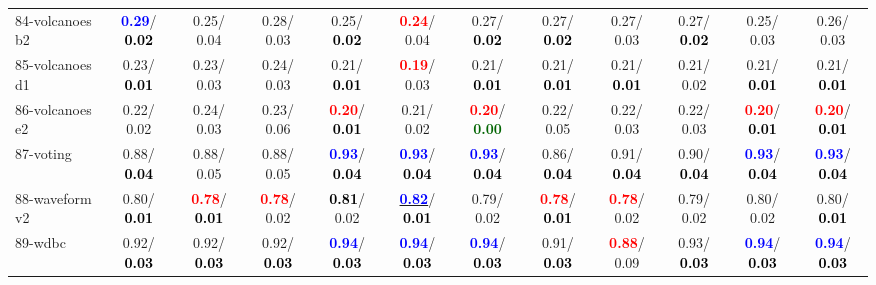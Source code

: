 \begin{table}[h]
\begin{center}
{\begin{tabular}{lc|c|c|c|c|c|c|c|c|c|c}
84-volcanoes b2 & \textcolor{blue}{\textbf{  0.29}}/\textcolor{black}{\textbf{  0.02}} &   0.25/  0.04 &   0.28/  0.03 &   0.25/\textcolor{black}{\textbf{  0.02}} & \textcolor{red}{\textbf{  0.24}}/  0.04 &   0.27/\textcolor{black}{\textbf{  0.02}} &   0.27/\textcolor{black}{\textbf{  0.02}} &   0.27/  0.03 &   0.27/\textcolor{black}{\textbf{  0.02}} &   0.25/  0.03 &   0.26/  0.03 \\
85-volcanoes d1 &   0.23/\textcolor{black}{\textbf{  0.01}} &   0.23/  0.03 &   0.24/  0.03 &   0.21/\textcolor{black}{\textbf{  0.01}} & \textcolor{red}{\textbf{  0.19}}/  0.03 &   0.21/\textcolor{black}{\textbf{  0.01}} &   0.21/\textcolor{black}{\textbf{  0.01}} &   0.21/\textcolor{black}{\textbf{  0.01}} &   0.21/  0.02 &   0.21/\textcolor{black}{\textbf{  0.01}} &   0.21/\textcolor{black}{\textbf{  0.01}} \\ \hline
86-volcanoes e2 &   0.22/  0.02 &   0.24/  0.03 &   0.23/  0.06 & \textcolor{red}{\textbf{  0.20}}/\textcolor{black}{\textbf{  0.01}} &   0.21/  0.02 & \textcolor{red}{\textbf{  0.20}}/\textcolor{darkgreen}{\textbf{  0.00}} &   0.22/  0.05 &   0.22/  0.03 &   0.22/  0.03 & \textcolor{red}{\textbf{  0.20}}/\textcolor{black}{\textbf{  0.01}} & \textcolor{red}{\textbf{  0.20}}/\textcolor{black}{\textbf{  0.01}} \\
87-voting &   0.88/\textcolor{black}{\textbf{  0.04}} &   0.88/  0.05 &   0.88/  0.05 & \textcolor{blue}{\textbf{  0.93}}/\textcolor{black}{\textbf{  0.04}} & \textcolor{blue}{\textbf{  0.93}}/\textcolor{black}{\textbf{  0.04}} & \textcolor{blue}{\textbf{  0.93}}/\textcolor{black}{\textbf{  0.04}} &   0.86/\textcolor{black}{\textbf{  0.04}} &   0.91/\textcolor{black}{\textbf{  0.04}} &   0.90/\textcolor{black}{\textbf{  0.04}} & \textcolor{blue}{\textbf{  0.93}}/\textcolor{black}{\textbf{  0.04}} & \textcolor{blue}{\textbf{  0.93}}/\textcolor{black}{\textbf{  0.04}} \\
88-waveform v2 &   0.80/\textcolor{black}{\textbf{  0.01}} & \textcolor{red}{\textbf{  0.78}}/\textcolor{black}{\textbf{  0.01}} & \textcolor{red}{\textbf{  0.78}}/  0.02 & \textcolor{black}{\textbf{  0.81}}/  0.02 & \underline{\textcolor{blue}{\textbf{  0.82}}}/\textcolor{black}{\textbf{  0.01}} &   0.79/  0.02 & \textcolor{red}{\textbf{  0.78}}/\textcolor{black}{\textbf{  0.01}} & \textcolor{red}{\textbf{  0.78}}/  0.02 &   0.79/  0.02 &   0.80/  0.02 &   0.80/\textcolor{black}{\textbf{  0.01}} \\
89-wdbc &   0.92/\textcolor{black}{\textbf{  0.03}} &   0.92/\textcolor{black}{\textbf{  0.03}} &   0.92/\textcolor{black}{\textbf{  0.03}} & \textcolor{blue}{\textbf{  0.94}}/\textcolor{black}{\textbf{  0.03}} & \textcolor{blue}{\textbf{  0.94}}/\textcolor{black}{\textbf{  0.03}} & \textcolor{blue}{\textbf{  0.94}}/\textcolor{black}{\textbf{  0.03}} &   0.91/\textcolor{black}{\textbf{  0.03}} & \textcolor{red}{\textbf{  0.88}}/  0.09 &   0.93/\textcolor{black}{\textbf{  0.03}} & \textcolor{blue}{\textbf{  0.94}}/\textcolor{black}{\textbf{  0.03}} & \textcolor{blue}{\textbf{  0.94}}/\textcolor{black}{\textbf{  0.03}} \\

\end{tabular}}
\end{center}
\end{table}
